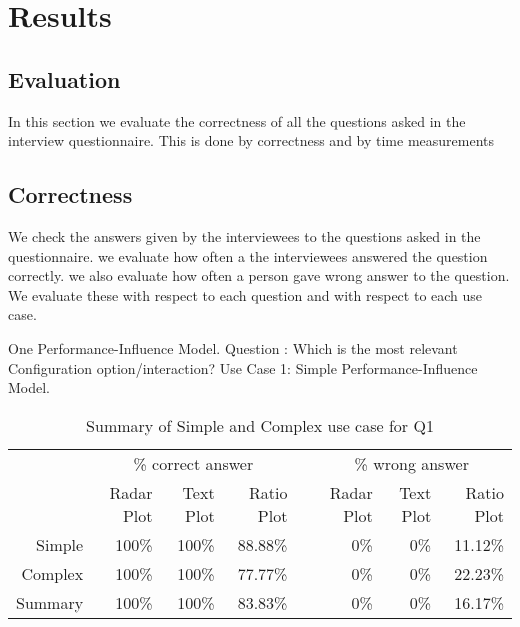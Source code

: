 \chapter{Results}




\section{Evaluation}
In this section we evaluate the correctness of all the questions asked in the interview questionnaire.
This is done by correctness and by time measurements
  
\section{Correctness}
 We check the answers given by the interviewees to the questions asked in the questionnaire. we evaluate how often a the interviewees answered the question correctly. we also evaluate how often a person gave wrong answer to the question. We evaluate these with respect to each question and with respect to each use case.
 
One Performance-Influence Model.
\newline
Question : Which is the most relevant Configuration option/interaction?
\newline
\newline
Use Case 1: Simple Performance-Influence Model.

\begin{table*}[htbp]
\begin{tabular}{@{}rrrrcrrr@{}}\toprule
    & \multicolumn{3}{c}{\% correct answer} & \phantom{abc}& \multicolumn{3}{c}{\% wrong answer} \\
\cmidrule{2-4} \cmidrule{6-8} \cmidrule{10-12}
& Radar Plot & Text Plot & Ratio Plot && Radar Plot & Text Plot & Ratio Plot \\ \midrule
Simple & 100\% & 100\% & 88.88\% && 0\% & 0\% & 11.12\% \\
Complex & 100\% & 100\% & 77.77\% && 0\% & 0\% & 22.23\%\\
\toprule
Summary & 100\% & 100\% & 83.83\% && 0\% & 0\% & 16.17\%\\
\bottomrule
\end{tabular}
\caption{Summary of Simple and Complex use case for Q1}
\end{table*}

